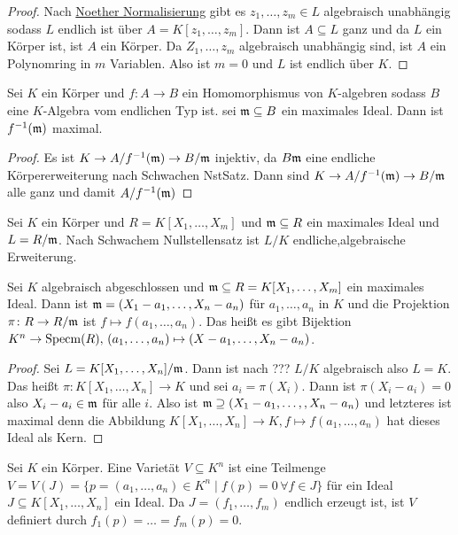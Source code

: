 \begin{proof}
    Nach \hyperref[Satz:NoetherNor]{Noether Normalisierung} gibt es $z_1,\dots,z_m\in L$ algebraisch unabhängig sodass $L$ endlich ist über $A=K[z_1,\dots,z_m]$.
    Dann ist $A\subseteq L$ ganz und da $L$ ein Körper ist, ist $A$ ein Körper.
    Da $Z_1,\dots,z_m$ algebraisch unabhängig sind, ist $A$ ein Polynomring in $m$ Variablen. Also ist $m=0$ und $L$ ist endlich über $K$.
\end{proof}
\begin{Kor}
    Sei $K$ ein Körper und $f\colon A\to B$ ein Homomorphismus von $K$-algebren sodass $B$ eine $K$-Algebra vom endlichen Typ ist. sei $\mathfrak{m}\subseteq B$ ein maximales Ideal. Dann ist $f^{-1}(\mathfrak{m})$ maximal.
\end{Kor}
\begin{proof}
    Es ist $K\to A/f^{-1}(\mathfrak{m})\to B/\mathfrak{m}$ injektiv, da $B\frak m$ eine endliche Körpererweiterung nach Schwachen NstSatz. Dann sind $K\to A/f^{-1}(\mathfrak{m})\to B/\mathfrak{m}$ alle ganz und damit $A/f^{-1}(\mathfrak{m})$ %
\end{proof}
\begin{Bsp}
    Sei $K$ ein Körper und $R=K[X_1,\dots,X_m]$ und $\mathfrak{m}\subseteq R$ ein maximales Ideal und $L=R/\mathfrak{m}$.
    Nach Schwachem Nullstellensatz ist $L/K$ endliche,algebraische Erweiterung.
    
\end{Bsp}
\begin{Kor}
    Sei $K$ algebraisch abgeschlossen und $\mathfrak{m}\subseteq R=K[X_1,\dots,X_m]$ ein maximales Ideal. Dann ist $\mathfrak{m}=(X_1-a_1,\dots,X_n-a_n)$ für $a_1,\dots,a_n$ in $K$ und die Projektion $\pi\colon R\to R/\mathfrak{m}$ ist $f\mapsto f(a_1,\dots,a_n)$.
    Das heißt es gibt Bijektion $K^n\to \operatorname{Specm}(R),\, (a_1,\dots,a_n)\mapsto (X-a_1,\dots,X_n-a_n)$.
\end{Kor}
\begin{proof}
    Sei $L=K[X_1,\dots,X_n]/\mathfrak{m}$. Dann ist nach ??? $L/K$ algebraisch also $L=K$.
    Das heißt $\pi\colon K[X_1,\dots,X_n]\to K$ und sei $a_i=\pi(X_i)$.
    Dann ist $\pi(X_i-a_i)=0$ also $X_i-a_i\in\mathfrak{m}$ für alle $i$.
    Also ist $\mathfrak{m}\supseteq (X_1-a_1,\dots,,X_n-a_n)$ und letzteres ist maximal denn die Abbildung $K[X_1,\dots,X_n]\to K, f\mapsto f(a_1,\dots,a_n)$ hat dieses Ideal als Kern.
\end{proof}
\begin{Def}
    Sei $K$ ein Körper. Eine Varietät $V\subseteq K^n$ ist eine Teilmenge $V=V(J)=\{p=(a_1,\dots,a_n)\in K^n\mid f(p)=0\, \forall f\in J\}$  für ein Ideal $J\subseteq K[X_1,\dots,X_n]$ ein Ideal. Da $J=(f_1,\dots,f_m)$ endlich erzeugt ist, ist $V$ definiert durch $f_1(p)=\dots=f_m(p)=0$.
\end{Def}
